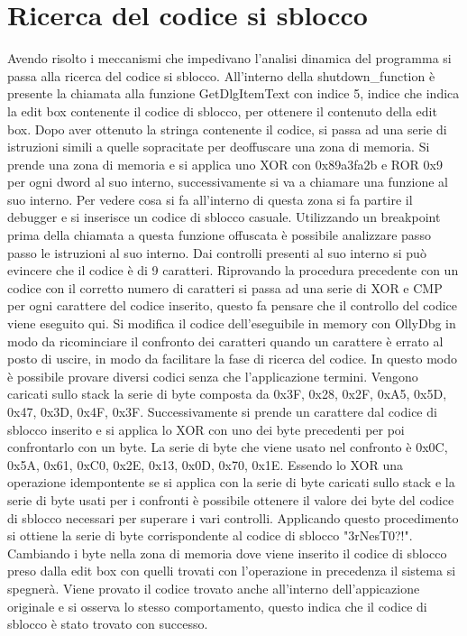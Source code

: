 \documentclass[a4paper,12pt]{article}
\begin{document}
\section{Ricerca del codice si sblocco}
Avendo risolto i meccanismi che impedivano l'analisi dinamica del programma si passa alla ricerca del codice si sblocco. All'interno della shutdown\_function è presente la chiamata alla funzione GetDlgItemText con indice 5, indice che indica la edit box contenente il codice di sblocco, per ottenere il contenuto della edit box. Dopo aver ottenuto la stringa  contenente il codice, si passa ad una serie di istruzioni simili a quelle sopracitate per deoffuscare una zona di memoria. Si prende una zona di memoria e si applica uno XOR con 0x89a3fa2b e ROR 0x9 per ogni dword al suo interno, successivamente si va a chiamare una funzione al suo interno. Per vedere cosa si fa all'interno di questa zona si fa partire il debugger e si inserisce un codice di sblocco casuale. Utilizzando un breakpoint prima della chiamata a questa funzione offuscata è possibile analizzare passo passo le istruzioni al suo interno. Dai controlli presenti al suo interno si può evincere che il codice è di 9 caratteri. Riprovando la procedura precedente con un codice con il corretto numero di caratteri si passa ad una serie di XOR e CMP per ogni carattere del codice inserito, questo fa pensare che il controllo del codice viene eseguito qui. Si modifica il codice dell'eseguibile in memory con OllyDbg in modo da ricominciare il confronto dei caratteri quando un carattere è errato al posto di uscire, in modo da facilitare la fase di ricerca del codice. 
In questo modo è possibile provare diversi codici senza che l'applicazione termini. Vengono caricati sullo stack la serie di byte composta da 0x3F, 0x28, 0x2F, 0xA5, 0x5D, 0x47, 0x3D, 0x4F, 0x3F. Successivamente si prende un carattere dal codice di sblocco inserito e si applica lo XOR con uno dei byte precedenti per poi confrontarlo con un byte. La serie di byte che viene usato nel confronto è 0x0C, 0x5A, 0x61, 0xC0, 0x2E, 0x13, 0x0D, 0x70, 0x1E. Essendo lo XOR una operazione idempontente se si applica con la serie di byte caricati sullo stack e la serie di byte usati per i confronti è possibile ottenere il valore dei byte del codice di sblocco necessari per superare i vari controlli. Applicando questo procedimento si ottiene la serie di byte corrispondente al codice di sblocco "3rNesT0?!". Cambiando i byte nella zona di memoria dove viene inserito il codice di sblocco preso dalla edit box con quelli trovati con l'operazione in precedenza il sistema si spegnerà. Viene provato il codice trovato anche all'interno dell'appicazione originale e si osserva lo stesso comportamento, questo indica che il codice di sblocco è stato trovato con successo. 
\end{document}
